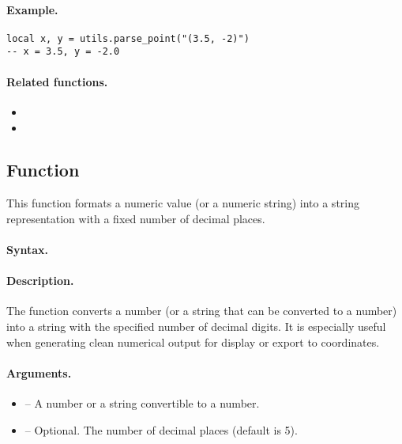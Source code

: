 \paragraph{Example.}
\begin{verbatim}
local x, y = utils.parse_point("(3.5, -2)")
-- x = 3.5, y = -2.0
\end{verbatim}

\paragraph{Related functions.}
\begin{itemize}
\item {}
\item {}
\end{itemize}


\subsection{Function } %
\label{sub:function_utils_format_number}

This function formats a numeric value (or a numeric string) into a string representation with a fixed number of decimal places.

\paragraph{Syntax.}
\begin{center}
\end{center}

\paragraph{Description.}
The function converts a number (or a string that can be converted to a number) into a string with the specified number of decimal digits. It is especially useful when generating clean numerical output for display or export to \TIKZ{} coordinates.

\paragraph{Arguments.}
\begin{itemize}
\item {} – A number or a string convertible to a number.
\item {} – Optional. The number of decimal places (default is 5).
\end{itemize}

